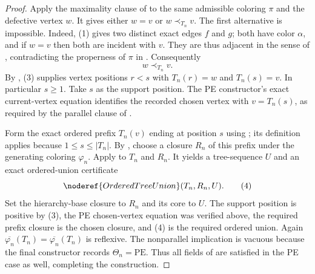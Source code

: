 \begin{proof}
Apply the maximality clause of  to the
same admissible coloring $\pi$ and the defective vertex $w$.  It gives
either $w=v$ or $w\prec_{T_n}v$.  The first alternative is impossible.
Indeed, (1) gives two distinct exact edges $f$ and $g$; both have color
$\alpha$, and if $w=v$ then both are incident with $v$.  They are thus
adjacent in the sense of , contradicting the
properness of $\pi$ in .  Consequently
\[
                              w\prec_{T_n}v.                     \tag{3}
\]
By , (3) supplies vertex positions $r<s$ with
$T_n(r)=w$ and $T_n(s)=v$.  In particular $s\geq1$.  Take $s$ as the
support position.  The PE constructor's exact current-vertex equation
identifies the recorded chosen vertex with $v=T_n(s)$, as required by the
parallel clause of .

Form the exact ordered prefix $T_n(v)$ ending at position $s$ using
; its definition applies because
$1\leq s\leq\lvert T_n\rvert$.  By
, choose a closure $R_n$ of this prefix
under the generating coloring $\varphi_n$.  Apply
 to $T_n$ and $R_n$.  It yields a
tree-sequence $U$ and an exact ordered-union certificate
\[
             \noderef{OrderedTreeUnion}(T_n,R_n,U).              \tag{4}
\]
Set the hierarchy-base closure to $R_n$ and its core to $U$.  The support
position is positive by (3), the PE chosen-vertex equation was verified
above, the required prefix closure is the chosen closure, and (4) is the
required ordered union.  Again
$\overline{\varphi_n}(T_n)=\overline{\varphi_n}(T_n)$ is reflexive.  The
nonparallel implication is vacuous because the final constructor records
$\Theta_n=\mathrm{PE}$.  Thus all fields of  are
satisfied in the PE case as well, completing the construction.
\end{proof}
